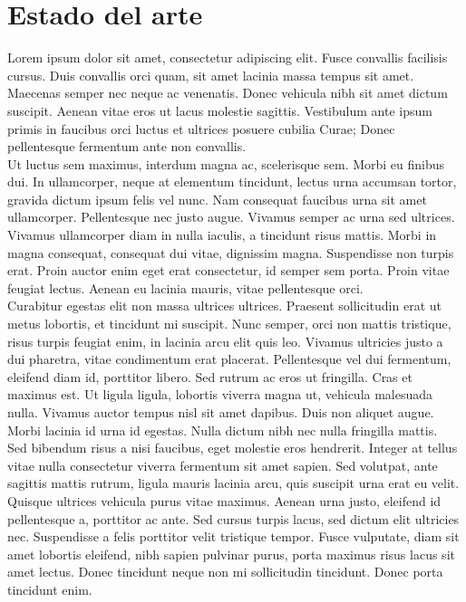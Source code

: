 

\chapter{Estado del arte}




Lorem ipsum dolor sit amet, consectetur adipiscing elit. Fusce convallis facilisis cursus. Duis convallis orci quam, sit amet lacinia massa tempus sit amet. Maecenas semper nec neque ac venenatis. Donec vehicula nibh sit amet dictum suscipit. Aenean vitae eros ut lacus molestie sagittis. Vestibulum ante ipsum primis in faucibus orci luctus et ultrices posuere cubilia Curae; Donec pellentesque fermentum ante non convallis.
\\

Ut luctus sem maximus, interdum magna ac, scelerisque sem. Morbi eu finibus dui. In ullamcorper, neque at elementum tincidunt, lectus urna accumsan tortor, gravida dictum ipsum felis vel nunc. Nam consequat faucibus urna sit amet ullamcorper. Pellentesque nec justo augue. Vivamus semper ac urna sed ultrices. Vivamus ullamcorper diam in nulla iaculis, a tincidunt risus mattis. Morbi in magna consequat, consequat dui vitae, dignissim magna. Suspendisse non turpis erat. Proin auctor enim eget erat consectetur, id semper sem porta. Proin vitae feugiat lectus. Aenean eu lacinia mauris, vitae pellentesque orci.
\\

Curabitur egestas elit non massa ultrices ultrices. Praesent sollicitudin erat ut metus lobortis, et tincidunt mi suscipit. Nunc semper, orci non mattis tristique, risus turpis feugiat enim, in lacinia arcu elit quis leo. Vivamus ultricies justo a dui pharetra, vitae condimentum erat placerat. Pellentesque vel dui fermentum, eleifend diam id, porttitor libero. Sed rutrum ac eros ut fringilla. Cras et maximus est. Ut ligula ligula, lobortis viverra magna ut, vehicula malesuada nulla. Vivamus auctor tempus nisl sit amet dapibus. Duis non aliquet augue. Morbi lacinia id urna id egestas. Nulla dictum nibh nec nulla fringilla mattis.
\\

Sed bibendum risus a nisi faucibus, eget molestie eros hendrerit. Integer at tellus vitae nulla consectetur viverra fermentum sit amet sapien. Sed volutpat, ante sagittis mattis rutrum, ligula mauris lacinia arcu, quis suscipit urna erat eu velit. Quisque ultrices vehicula purus vitae maximus. Aenean urna justo, eleifend id pellentesque a, porttitor ac ante. Sed cursus turpis lacus, sed dictum elit ultricies nec. Suspendisse a felis porttitor velit tristique tempor. Fusce vulputate, diam sit amet lobortis eleifend, nibh sapien pulvinar purus, porta maximus risus lacus sit amet lectus. Donec tincidunt neque non mi sollicitudin tincidunt. Donec porta tincidunt enim.
\\

